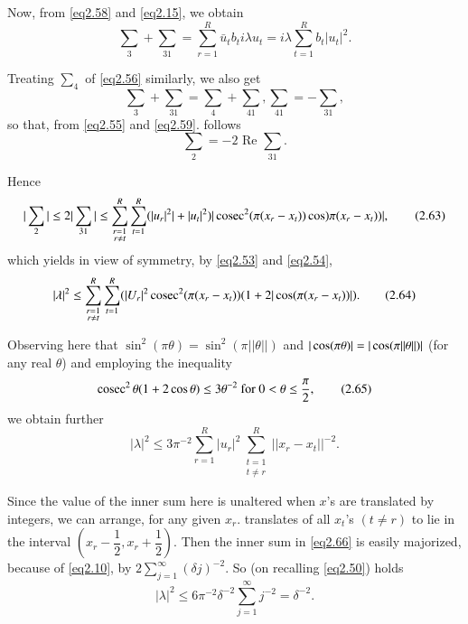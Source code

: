 Now, from \eqref{eq2.58} and \eqref{eq2.15}, we obtain
\begin{equation*}
\sum_3 + \sum_{31}= \sum_{r=1}^{R} \bar{u}_t b_t i \lambda u_t = i
\lambda \sum_{t=1}^{R} b_t|u_t |^2. \tag{2.60}\label{eq2.60} 
\end{equation*}

Treating  $\sum_4$ of \eqref{eq2.56} similarly, we also get
\begin{equation*}
\sum_3+ \sum_{31} = \sum_4 +\sum_{41}, \sum_{41} =-\sum_{31},
\tag{2.61}\label{eq2.61} 
\end{equation*}
so that, from \eqref{eq2.55} and \eqref{eq2.59}. follows
\begin{equation*}
\sum_2 =-2 \text{ Re } \sum_{31}. \tag{2.62}\label{eq2.62}
\end{equation*}

Hence 
\begin{equation*}
|\sum_2 | \leq 2 | \sum_{31}| \leq  \sum_{\substack{r=1 \\ r \neq
    t}}^{R} \sum_{t=1}^{R} (|u_r|^2 | + |u_t|^2) | \operatorname{cosec}^2 (\pi ( x_r
-x_t )) \cos )\pi (x_r-x_t))|, \tag{2.63}\label{eq2.63} 
\end{equation*}
which yields in view of symmetry, by \eqref{eq2.53} and \eqref{eq2.54},
\begin{equation*}
|\lambda|^2 \leq \sum_{\substack{r=1 \\ r \neq t}}^{R} \sum_{t=1}^{R}
(|U_r|^2 \operatorname{cosec}^2 (\pi(x_r -x_t))(1+2| \cos (\pi (x_r- x_t
))|). \tag{2.64}\label{eq2.64} 
\end{equation*}

Observing here that $\sin^2(\pi \theta) = \sin^2(\pi || \theta ||)$ and
$| \cos (\pi \theta)| =\break | \cos (\pi||\theta ||)|$ (for any real
$\theta$) and employing the inequality 
\begin{equation*}
\operatorname{cosec}^2 \theta (1+2 \cos \theta) \leq 3 \theta^{-2} \text{ for }
0<\theta \leq \frac{\pi}{2}, \tag{2.65}\label{eq2.65} 
\end{equation*}\pageoriginale
we obtain further
\begin{equation*}
|\lambda |^2 \leq 3 \pi^{-2} \sum_{r=1}^{R}|u_r|^2 \sum_{\substack{t=1 \\ t \neq r}}^{R} ||x_r-x_t||^{-2}. \tag{2.66}\label{eq2.66}
\end{equation*}

Since the value of the inner sum here is unaltered when $x$'s are
translated by integers, we can arrange, for any given
$x_r$. translates of all $x_t$'s $(t \neq r)$ to lie in the interval
$(x_r-\dfrac{1}{2},x_r+\dfrac{1}{2})$. Then the inner sum in \eqref{eq2.66}
is easily majorized, because of \eqref{eq2.10}, by $2
\sum\limits_{j=1}^{\infty}(\delta j)^{-2}$. So (on recalling \eqref{eq2.50})
holds  
\begin{equation*}
|\lambda|^2 \leq 6 \pi^{-2} \delta^{-2} \sum
^{\infty}_{j=1}j^{-2}=\delta^{-2}. \tag{2.67} \label{eq2.67}
\end{equation*}

